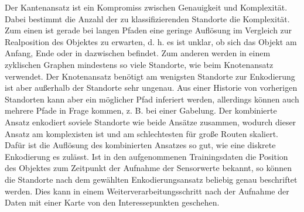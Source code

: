 Der Kantenansatz ist ein Kompromiss zwischen Genauigkeit und Komplexität.
Dabei bestimmt die Anzahl der zu klassifizierenden Standorte die Komplexität.
Zum einen ist gerade bei langen Pfaden eine geringe Auflösung im Vergleich zur Realposition des Objektes zu erwarten,
d. h. es ist unklar, ob sich das Objekt am Anfang, Ende oder in dazwischen befindet.
Zum anderen werden in einem zyklischen Graphen mindestens so viele Standorte, wie beim Knotenansatz verwendet.
Der Knotenansatz benötigt am wenigsten Standorte zur Enkodierung ist aber außerhalb der Standorte sehr ungenau.
Aus einer Historie von vorherigen Standorten kann aber ein möglicher Pfad inferiert werden,
allerdings können auch mehrere Pfade in Frage kommen, z. B. bei einer Gabelung.
Der kombinierte Ansatz enkodiert soviele Standorte wie beide Ansätze zusammen,
wodurch dieser Ansatz am komplexisten ist und am schlechtesten für große Routen skaliert.
Dafür ist die Auflösung des kombinierten Ansatzes so gut, wie eine diskrete Enkodierung es zulässt.
\newline
\newline
Ist in den aufgenommenen Trainingsdaten die Position des Objektes zum Zeitpunkt der Aufnahme der Sensorwerte bekannt,
so können die Standorte nach dem gewählten Enkodierungsansatz beliebig genau beschriftet werden.
Dies kann in einem Weiterverarbeitungsschritt nach der Aufnahme der Daten mit einer Karte von den Interessepunkten geschehen.